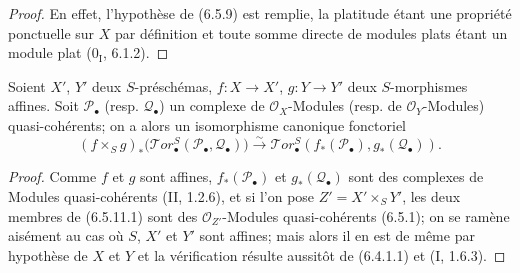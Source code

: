 \begin{proof}
En effet, l'hypothèse de (6.5.9) est remplie, la platitude étant une propriété
ponctuelle sur $X$ par définition et toute somme directe de modules plats étant
un module plat ($0_{\mathrm I}$, 6.1.2).
\end{proof}

\begin{proposition}[6.5.11]
Soient $X'$, $Y'$ deux $S$-préschémas, $f:X\to X'$, $g:Y\to Y'$ deux
$S$-morphismes affines. Soit $\mathscr P_\bullet$ (resp.
$\mathscr Q_\bullet$) un complexe de $\mathscr O_X$-Modules (resp. de
$\mathscr O_Y$-Modules) quasi-cohérents; on a alors un isomorphisme canonique
fonctoriel
\[
  (f\times_S g)_*
  \bigl(\mathscr{T}\!or_\bullet^S
    (\mathscr P_\bullet,\mathscr Q_\bullet)\bigr)
  \xrightarrow{\sim}
  \mathscr{T}\!or_\bullet^S
  (f_*(\mathscr P_\bullet),g_*(\mathscr Q_\bullet)).
  \tag{6.5.11.1}\label{III.6.5.11.1.fr}
\]
\end{proposition}

\begin{proof}
Comme $f$ et $g$ sont affines, $f_*(\mathscr P_\bullet)$ et
$g_*(\mathscr Q_\bullet)$ sont des complexes de Modules quasi-cohérents
(II, 1.2.6), et si l'on pose $Z'=X'\times_S Y'$, les deux membres de (6.5.11.1)
sont des $\mathscr O_{Z'}$-Modules quasi-cohérents (6.5.1); on se ramène
aisément au cas où $S$, $X'$ et $Y'$ sont affines; mais alors il en est de même
par hypothèse de $X$ et $Y$ et la vérification résulte aussitôt de (6.4.1.1) et
(I, 1.6.3).
\end{proof}


